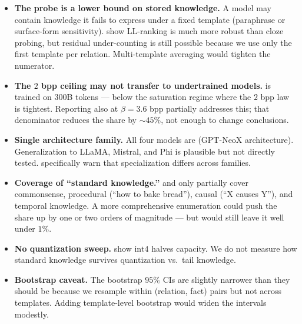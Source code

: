 \begin{itemize}[leftmargin=*,itemsep=0pt,topsep=0pt]
    \item \textbf{The probe is a lower bound on stored knowledge.} A model may contain knowledge it fails to express under a fixed template (paraphrase or surface-form sensitivity). \citet{wiland2024bear} show LL-ranking is much more robust than cloze probing, but residual under-counting is still possible because we use only the first \bear template per relation. Multi-template averaging would tighten the numerator.
    \item \textbf{The \(2\) bpp ceiling may not transfer to undertrained models.} \pythia is trained on \(300\)B tokens --- below the saturation regime where the \(2\) bpp law is tightest. Reporting also at \(\beta = 3.6\) bpp partially addresses this; that denominator reduces the share by \(\sim 45\%\), not enough to change conclusions.
    \item \textbf{Single architecture family.} All four models are \pythia (GPT-NeoX architecture). Generalization to LLaMA, Mistral, and Phi is plausible but not directly tested. \citet{hong2025specialization} specifically warn that specialization differs across families.
    \item \textbf{Coverage of ``standard knowledge.''} \bear and \taxi only partially cover commonsense, procedural (``how to bake bread''), causal (``X causes Y''), and temporal knowledge. A more comprehensive enumeration could push the share up by one or two orders of magnitude --- but would still leave it well under \(1\%\).
    \item \textbf{No quantization sweep.} \citet{allenzhu2024knowledge} show \(\text{int}4\) halves capacity. We do not measure how standard knowledge survives quantization vs.\ tail knowledge.
    \item \textbf{Bootstrap caveat.} The bootstrap \(95\%\) CIs are slightly narrower than they should be because we resample within (relation, fact) pairs but not across templates. Adding template-level bootstrap would widen the intervals modestly.
\end{itemize}
